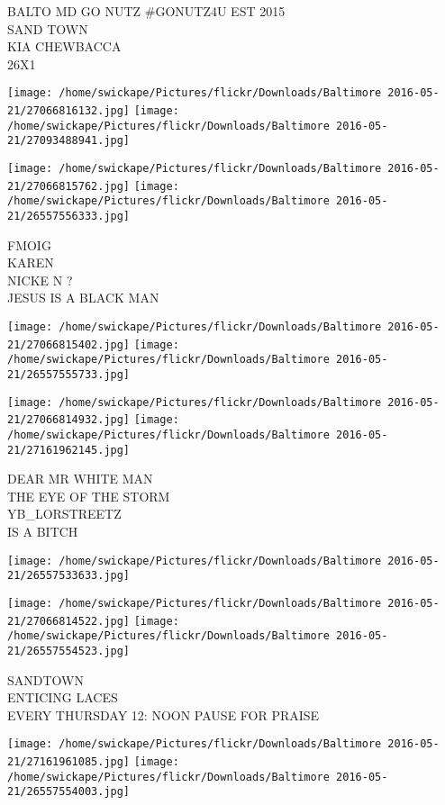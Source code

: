 \documentclass[10pt,letterpaper]{article}
\begin{document}
BALTO MD GO NUTZ \#GONUTZ4U EST 2015\\
SAND TOWN\\
KIA CHEWBACCA\\
26X1
\pagebreak

\texttt{[image: /home/swickape/Pictures/flickr/Downloads/Baltimore 2016-05-21/27066816132.jpg]}
\texttt{[image: /home/swickape/Pictures/flickr/Downloads/Baltimore 2016-05-21/27093488941.jpg]}

\texttt{[image: /home/swickape/Pictures/flickr/Downloads/Baltimore 2016-05-21/27066815762.jpg]}
\texttt{[image: /home/swickape/Pictures/flickr/Downloads/Baltimore 2016-05-21/26557556333.jpg]}

FMOIG\\
KAREN\\
NICKE N ?\\
JESUS IS A BLACK MAN
\pagebreak

\texttt{[image: /home/swickape/Pictures/flickr/Downloads/Baltimore 2016-05-21/27066815402.jpg]}
\texttt{[image: /home/swickape/Pictures/flickr/Downloads/Baltimore 2016-05-21/26557555733.jpg]}

\texttt{[image: /home/swickape/Pictures/flickr/Downloads/Baltimore 2016-05-21/27066814932.jpg]}
\texttt{[image: /home/swickape/Pictures/flickr/Downloads/Baltimore 2016-05-21/27161962145.jpg]}

DEAR MR WHITE MAN\\
THE EYE OF THE STORM\\
YB\_LORSTREETZ\\
IS A BITCH
\pagebreak

\texttt{[image: /home/swickape/Pictures/flickr/Downloads/Baltimore 2016-05-21/26557533633.jpg]}

\vspace{0.25in}
\texttt{[image: /home/swickape/Pictures/flickr/Downloads/Baltimore 2016-05-21/27066814522.jpg]}
\texttt{[image: /home/swickape/Pictures/flickr/Downloads/Baltimore 2016-05-21/26557554523.jpg]}

SANDTOWN\\
ENTICING LACES\\
EVERY THURSDAY 12: NOON PAUSE FOR PRAISE
\pagebreak

\texttt{[image: /home/swickape/Pictures/flickr/Downloads/Baltimore 2016-05-21/27161961085.jpg]}
\texttt{[image: /home/swickape/Pictures/flickr/Downloads/Baltimore 2016-05-21/26557554003.jpg]}
\end{document}
